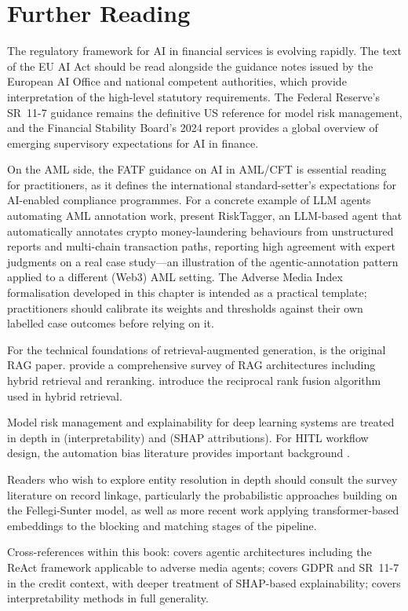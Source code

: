 \section{Further Reading}
\label{sec:ch11-further-reading}

The regulatory framework for AI in financial services is evolving rapidly. The text of the EU AI Act \cite{euaiact2024} should be read alongside the guidance notes issued by the European AI Office and national competent authorities, which provide interpretation of the high-level statutory requirements. The Federal Reserve's SR~11-7 guidance \cite{sr117} remains the definitive US reference for model risk management, and the Financial Stability Board's 2024 report \cite{FSB2024stability} provides a global overview of emerging supervisory expectations for AI in finance.

On the AML side, the FATF guidance on AI in AML/CFT \cite{fatf2021aml} is essential reading for practitioners, as it defines the international standard-setter's expectations for AI-enabled compliance programmes. For a concrete example of LLM agents automating AML annotation work, \citet{lin2025risktagger} present RiskTagger, an LLM-based agent that automatically annotates crypto money-laundering behaviours from unstructured reports and multi-chain transaction paths, reporting high agreement with expert judgments on a real case study---an illustration of the agentic-annotation pattern applied to a different (Web3) AML setting. The Adverse Media Index formalisation developed in this chapter is intended as a practical template; practitioners should calibrate its weights and thresholds against their own labelled case outcomes before relying on it.

For the technical foundations of retrieval-augmented generation, \citet{lewis2020rag} is the original RAG paper. \citet{gao2024retrieval} provide a comprehensive survey of RAG architectures including hybrid retrieval and reranking. \citet{cormack2009reciprocal} introduce the reciprocal rank fusion algorithm used in hybrid retrieval.

Model risk management and explainability for deep learning systems are treated in depth in \citet{doshivelez2017rigorous} (interpretability) and \citet{lundberg2017unified} (SHAP attributions). For HITL workflow design, the automation bias literature provides important background \cite{batarseh2021survey}.

Readers who wish to explore entity resolution in depth should consult the survey literature on record linkage, particularly the probabilistic approaches building on the Fellegi-Sunter model, as well as more recent work applying transformer-based embeddings to the blocking and matching stages of the pipeline.

Cross-references within this book:  covers agentic architectures including the ReAct framework applicable to adverse media agents;  covers GDPR and SR~11-7 in the credit context, with deeper treatment of SHAP-based explainability;  covers interpretability methods in full generality.
